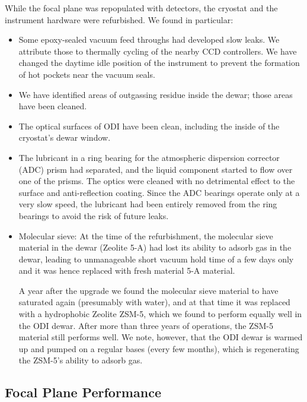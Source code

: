 \documentclass[]{spieman}
\begin{document}
While the focal plane was repopulated with detectors, the cryostat and the 
instrument hardware were refurbished. We found in particular:
\begin{itemize}
	\item Some epoxy-sealed vacuum feed throughs had developed slow leaks. We 
	attribute those to thermally cycling of the nearby CCD controllers. We have 
	changed the daytime idle position of the instrument to prevent the 
	formation of hot pockets near the vacuum seals.
	
	\item We have identified areas of outgassing residue inside the dewar; 
	those areas have been cleaned. 
	
	\item The optical surfaces of ODI have been clean, including the inside of 
	the cryostat's dewar window. 
	
	\item The lubricant in a ring bearing for the atmospheric dispersion 
	corrector (ADC) prism had separated, and the liquid component started to 
	flow 
	over one of the prisms. The optics were cleaned with no detrimental effect 
	to the surface and anti-reflection coating. Since the ADC bearings operate 
	only at a very slow speed, the lubricant had been entirely removed from the 
	ring bearings to avoid the risk of future leaks. 
	

\item  Molecular sieve: At the time of the refurbishment, the molecular 
sieve material in the dewar (Zeolite 5-A) had lost its ability to adsorb gas in 
the dewar, leading to unmanageable short vacuum hold time of a few days only 
and it was hence  replaced with fresh material 5-A material.

A year after the upgrade we found the molecular sieve material to
have saturated again (presumably with water), and at that time it was replaced 
with a hydrophobic Zeolite ZSM-5, which we found to perform equally well in the 
ODI dewar. After more than three years of operations, the ZSM-5 material still 
performs well. We note, however, that the ODI dewar is warmed up and pumped on 
a regular bases (every few months), which is regenerating the ZSM-5's ability 
to adsorb gas.
\end{itemize}

\subsection{Focal Plane  Performance}
\end{document}
